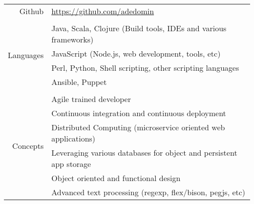 \documentclass[letterpaper,]{article}
\begin{document}
\begin{center}
\begin{tabular}{r|l}
    Github                     & \href{https://github.com/adedomin}{https://github.com/adedomin} \\
    \\
    \multirow{4}{*}{Languages} & Java, Scala, Clojure (Build tools, IDEs and various frameworks) \\
                               & JavaScript (Node.js, web development, tools, etc) \\
                               & Perl, Python, Shell scripting, other scripting languages \\
                               & Ansible, Puppet \\
    \\
    \multirow{6}{*}{Concepts} & Agile trained developer \\
                              & Continuous integration and continuous deployment \\
                              & Distributed Computing (microservice oriented web applications) \\
                              & Leveraging various databases for object and persistent app storage \\
                              & Object oriented and functional design \\
                              & Advanced text processing (regexp, flex/bison, pegjs, etc) \\
\end{tabular}
\end{center}
\end{document}
